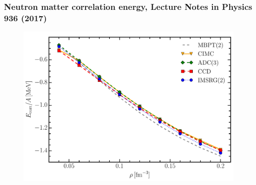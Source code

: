 \documentclass[compress]{beamer}
\begin{document}
\frame
{
  \frametitle{Neutron matter correlation energy, Lecture Notes in Physics {\bf 936} (2017)}
      \begin{figure}[htp]
        \centering	
        	\includegraphics[width=1.0\textwidth]{Figures/imsrg_pnm_ecorr.pdf}
      \end{figure}
}
\end{document}
